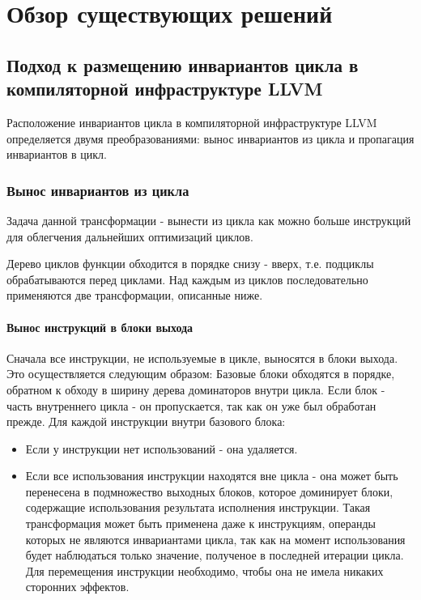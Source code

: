 \chapter{Обзор существующих решений}
\label{sec:Chapter2} 

\section{Подход к размещению инвариантов цикла в компиляторной инфраструктуре LLVM}

Расположение инвариантов цикла в компиляторной инфраструктуре LLVM определяется двумя преобразованиями: вынос инвариантов из цикла и пропагация инвариантов в цикл.

\subsection{Вынос инвариантов из цикла}

Задача данной трансформации - вынести из цикла как можно больше инструкций для облегчения дальнейших оптимизаций циклов.

Дерево циклов функции обходится в порядке снизу - вверх, т.е. подциклы обрабатываются перед циклами.
Над каждым из циклов последовательно применяются две трансформации, описанные ниже.

\subsubsection{Вынос инструкций в блоки выхода}

Сначала все инструкции, не используемые в цикле, выносятся в блоки выхода.
Это осуществляется следующим образом:
Базовые блоки обходятся в порядке, обратном к обходу в ширину дерева доминаторов внутри цикла.
Если блок - часть внутреннего цикла - он пропускается, так как он уже был обработан прежде.
Для каждой инструкции внутри базового блока:
\begin{itemize}
    \item Если у инструкции нет использований - она удаляется.
    \item Если все использования инструкции находятся вне цикла - она может быть перенесена в подмножество выходных блоков, которое доминирует блоки, содержащие использования результата исполнения инструкции.
        Такая трансформация может быть применена даже к инструкциям, операнды которых не являются инвариантами цикла, так как на момент использования будет наблюдаться только значение, полученое в последней итерации цикла.
        Для перемещения инструкции необходимо, чтобы она не имела никаких сторонних эффектов.
\end{itemize}

